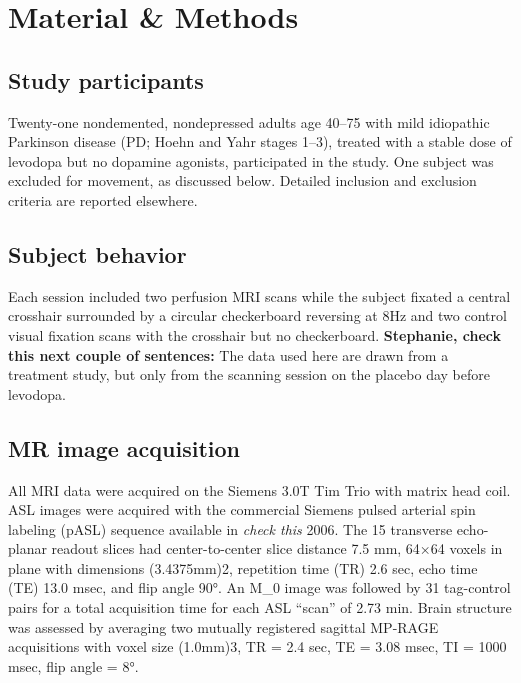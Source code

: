 \section{Material \& Methods}

\subsection{Study participants}
Twenty-one nondemented, nondepressed adults age 40–75 with mild idiopathic Parkinson disease (PD; Hoehn and Yahr stages 1–3),\cite{6067254} treated with a stable dose of levodopa but no dopamine agonists, participated in the study. One subject was excluded for movement, as discussed below. Detailed inclusion and exclusion criteria are reported elsewhere.\cite{Black_2010}

\subsection{Subject behavior}
Each session included two perfusion MRI scans while the subject fixated a central crosshair surrounded by a circular checkerboard reversing at 8Hz and two control visual fixation scans with the crosshair but no checkerboard. \textbf{Stephanie, check this next couple of sentences:} The data used here are drawn from a treatment study,\cite{Black_2010} but only from the scanning session on the placebo day before levodopa. 

\subsection{MR image acquisition}
All MRI data were acquired on the Siemens 3.0T Tim Trio with matrix head coil. ASL images were acquired with the commercial Siemens pulsed arterial spin labeling (pASL) sequence available in \textit{check this} 2006.\cite{Wang_2003} The 15 transverse echo-planar readout slices had center-to-center slice distance 7.5 mm, 64×64 voxels in plane with dimensions (3.4375mm)2, repetition time (TR) 2.6 sec, echo time (TE) 13.0 msec, and flip angle 90°. An M_{0} image was followed by 31 tag-control pairs for a total acquisition time for each ASL “scan” of 2.73 min. Brain structure was assessed by averaging two mutually registered sagittal MP-RAGE acquisitions with voxel size (1.0mm)3, TR = 2.4 sec, TE = 3.08 msec, TI = 1000 msec, flip angle = 8°.

